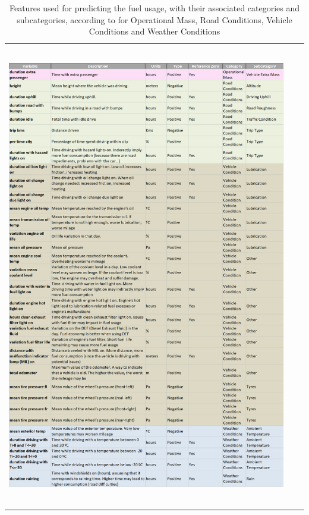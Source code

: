 \begin{table}[h!]
\centering
 \begin{tabular}{c@{\qquad}c@{\qquad}c}
\includegraphics[width=395pt, height=580pt, keepaspectratio]{figures/chapter6_LucaFleet/FARUsedpt2.png}
  \end{tabular} 
  \caption{Features used for predicting the fuel usage, with their associated categories and subcategories, according to \parencite{zacharof2016review} for Operational Mass, Road Conditions, Vehicle Conditions and Weather Conditions  \label{table:annex-FARUsedpt2}}
\end{table}

